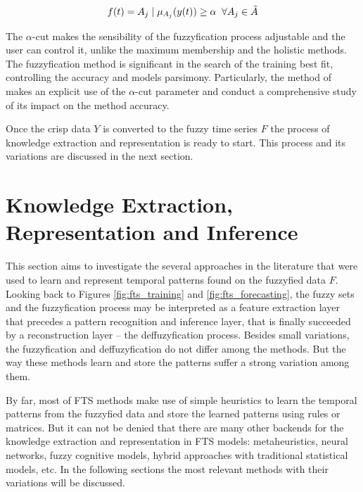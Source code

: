 \begin{equation}
f(t) = A_j\; |\; \mu_{A_j}(y(t)) \geq \alpha \;\; \forall A_j \in \tilde{A}    
\label{eqn:fuzzyfication_alpha}
\end{equation}

The $\alpha$-cut makes the sensibility of the fuzzyfication process adjustable and the user can control it, unlike the maximum membership and the holistic methods. The fuzzyfication method is significant in the search of the training best fit, controlling the accuracy and models parsimony. Particularly, the method of \cite{CarvalhoJr2017} makes an explicit use of the $\alpha$-cut parameter and conduct a comprehensive study of its impact on the method accuracy.

Once the crisp data $Y$ is converted to the fuzzy time series $F$ the process of knowledge extraction and representation is ready to start. This process and its variations are discussed in the next section.

%
\section{Knowledge Extraction, Representation and Inference}
\label{sec:fts_knowledge}

This section aims to investigate the several approaches in the literature that were used to learn and represent temporal patterns found on the fuzzyfied data $F$. Looking back to Figures \ref{fig:fts_training} and \ref{fig:fts_forecasting}, the fuzzy sets and the fuzzyfication process may be interpreted as a feature extraction layer that precedes a pattern recognition and inference layer, that is finally succeeded by a reconstruction layer -- the deffuzyfication process. Besides small variations, the fuzzyfication and deffuzyfication do not differ among the methods. But the way these methods learn and store the patterns suffer a strong variation among them.

By far, most of FTS methods make use of simple heuristics to learn the temporal patterns from the fuzzyfied data and store the learned patterns using rules or matrices. But it can not be denied that there are many other backends for the knowledge extraction and representation in FTS models: metaheuristics, neural networks, fuzzy cognitive models, hybrid approaches with traditional statistical models, etc. In the following sections the most relevant methods with their variations will be discussed. 

